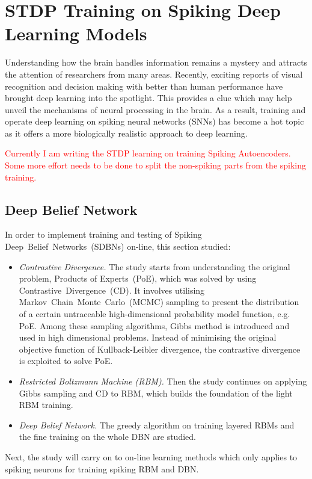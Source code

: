 \chapter{STDP Training on Spiking Deep Learning Models}
\label{cha:sdbn}
Understanding how the brain handles information remains a mystery and attracts the attention of researchers from many areas.
Recently, exciting reports of visual recognition and decision making with better than human performance have brought deep learning into the spotlight.
This provides a clue which may help unveil the mechanisms of neural processing in the brain.
As a result, training and operate deep learning on spiking neural networks (SNNs) has become a hot topic as it offers a more biologically realistic approach to deep learning.

\textcolor{red}{Currently I am writing the STDP learning on training Spiking Autoencoders. Some more effort needs to be done to split the non-spiking parts from the spiking training. }

\section{Deep Belief Network}
	In order to implement training and testing of Spiking Deep~Belief~Networks~(SDBNs) on-line, this section studied:
	\begin{itemize}
		\item \textit{Contrastive Divergence.}
		The study starts from understanding the original problem, Products of Experts~(PoE), which was solved by using Contrastive~Divergence~(CD).
		It involves utilising Markov~Chain~Monte~Carlo~(MCMC) sampling to present the distribution of a certain untraceable high-dimensional probability model function, e.g. PoE.
		Among these sampling algorithms, Gibbs method is introduced and used in high dimensional problems.
		Instead of minimising the original objective function of Kullback-Leibler divergence, the contrastive divergence is exploited to solve PoE.
		\item \textit{Restricted Boltzmann Machine (RBM). }
		Then the study continues on applying Gibbs sampling and CD to RBM, which builds the foundation of the light RBM training.
		\item \textit{Deep Belief Network.} 
		The greedy algorithm on training layered RBMs and the fine training on the whole DBN are studied.
	\end{itemize}
	Next, the study will carry on to on-line learning methods which only applies to spiking neurons for training spiking RBM and DBN.
